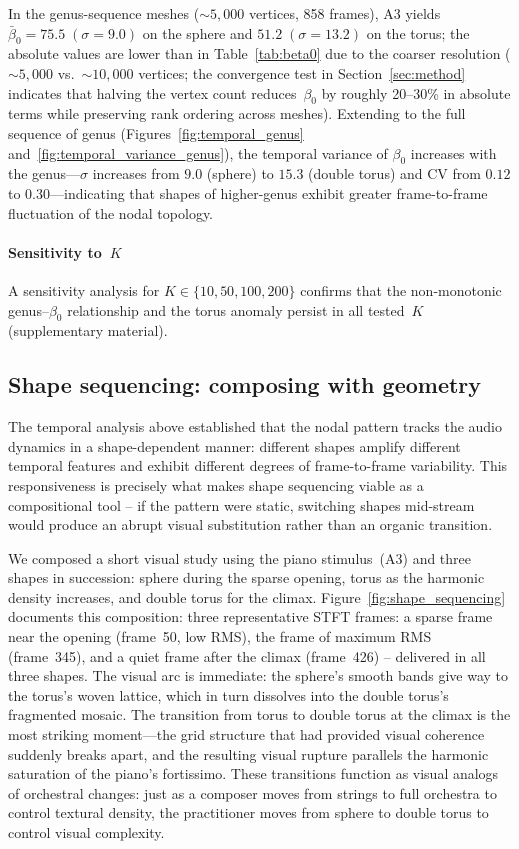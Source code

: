 \documentclass[]{interact}
\theoremstyle{plain}
\theoremstyle{definition}
\theoremstyle{remark}
\begin{document}
In the genus-sequence meshes (${\sim}5{,}000$ vertices, 858 frames), A3 yields $\bar{\beta}_0 = 75.5\;(\sigma=9.0)$ on the sphere and $51.2\;(\sigma=13.2)$ on the torus; the absolute values are lower than in Table~\ref{tab:beta0} due to the coarser resolution (${\sim}5{,}000$ vs.\ ${\sim}10{,}000$ vertices; the convergence test in Section~\ref{sec:method} indicates that halving the vertex count reduces~$\beta_0$ by roughly 20--30\% in absolute terms while preserving rank ordering across meshes). Extending to the full sequence of genus (Figures~\ref{fig:temporal_genus} and~\ref{fig:temporal_variance_genus}), the temporal variance of $\beta_0$ increases with the genus---$\sigma$ increases from $9.0$ (sphere) to $15.3$ (double torus) and CV from $0.12$ to $0.30$---indicating that shapes of higher-genus exhibit greater frame-to-frame fluctuation of the nodal topology.

\paragraph{Sensitivity to~$K$}
A sensitivity analysis for $K\in\{10,50,100,200\}$ confirms that the non-monotonic genus--$\beta_0$ relationship and the torus anomaly persist in all tested~$K$ (supplementary material).

\subsection{Shape sequencing: composing with geometry}
\label{sec:sequencing}

The temporal analysis above established that the nodal pattern tracks the audio dynamics in a shape-dependent manner: different shapes amplify different temporal features and exhibit different degrees of frame-to-frame variability. This responsiveness is precisely what makes shape sequencing viable as a compositional tool -- if the pattern were static, switching shapes mid-stream would produce an abrupt visual substitution rather than an organic transition.

We composed a short visual study using the piano stimulus~(A3) and three shapes in succession: sphere during the sparse opening, torus as the harmonic density increases, and double torus for the climax. Figure~\ref{fig:shape_sequencing} documents this composition: three representative STFT frames: a sparse frame near the opening (frame~50, low RMS), the frame of maximum RMS (frame~345), and a quiet frame after the climax (frame~426) -- delivered in all three shapes. The visual arc is immediate: the sphere's smooth bands give way to the torus's woven lattice, which in turn dissolves into the double torus's fragmented mosaic. The transition from torus to double torus at the climax is the most striking moment---the grid structure that had provided visual coherence suddenly breaks apart, and the resulting visual rupture parallels the harmonic saturation of the piano's fortissimo. These transitions function as visual analogs of orchestral changes: just as a composer moves from strings to full orchestra to control textural density, the practitioner moves from sphere to double torus to control visual complexity.
\end{document}
